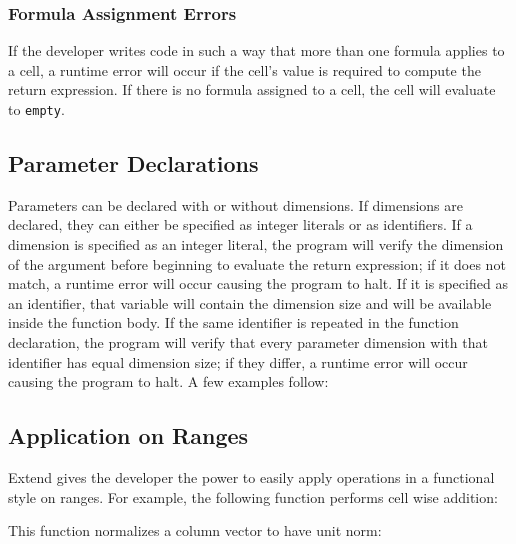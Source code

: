 \subsubsection{Formula Assignment Errors}
If the developer writes code in such a way that more than one formula applies to a cell, a runtime error will occur if the cell's value is required to compute the return expression. If there is no formula assigned to a cell, the cell will evaluate to \texttt{empty}.
\subsection{Parameter Declarations}
Parameters can be declared with or without dimensions. If dimensions are declared, they can either be specified as integer literals or as identifiers. If a dimension is specified as an integer literal, the program will verify the dimension of the argument before beginning to evaluate the return expression; if it does not match, a runtime error will occur causing the program to halt. If it is specified as an identifier, that variable will contain the dimension size and will be available inside the function body. If the same identifier is repeated in the function declaration, the program will verify that every parameter dimension with that identifier has equal dimension size; if they differ, a runtime error will occur causing the program to halt. A few examples follow:

\subsection{Application on Ranges}
Extend gives the developer the power to easily apply operations in a functional style on ranges. For example, the following function performs cell wise addition:

This function normalizes a column vector to have unit norm:

